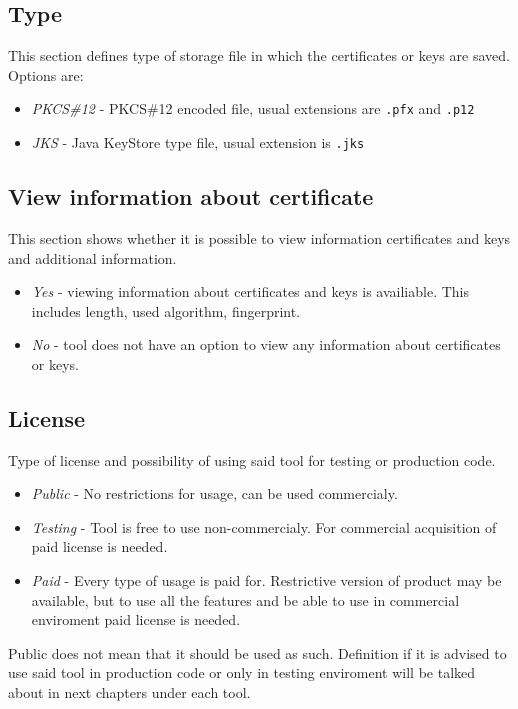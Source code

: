 \documentclass[10pt, a4paper]{report}
\begin{document}
\subsection{Type}
This section defines type of storage file in which the certificates or keys are saved. 
Options are:
    \begin{itemize}
     \item \textit{PKCS\#12} - PKCS\#12 encoded file, usual extensions are \verb+.pfx+ and \verb+.p12+
     \item \textit{JKS} - Java KeyStore type file, usual extension is \verb+.jks+
    \end{itemize}

\subsection{View information about certificate}
This section shows whether it is possible to view information certificates and keys and additional information. 
    \begin{itemize}
     \item \textit{Yes} - viewing information about certificates and keys is availiable. This includes length, used algorithm, fingerprint.
     \item \textit{No}  - tool does not have an option to view any information about certificates or keys.
    \end{itemize}

\subsection{License}
Type of license and possibility of using said tool for testing or production code. 
    \begin{itemize}
     \item \textit{Public} - No restrictions for usage, can be used commercialy.
     \item \textit{Testing} - Tool is free to use non-commercialy. For commercial acquisition of paid license is needed.
     \item \textit{Paid} - Every type of usage is paid for. Restrictive version of product may be available, but to use all the features and be able to use in commercial enviroment paid license is needed.
    \end{itemize}

Public does not mean that it should be used as such. Definition if it is advised to use said tool in production code or only in testing enviroment will be talked about in next chapters under each tool.
\end{document}
